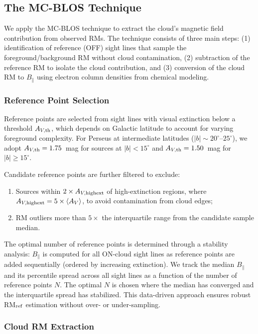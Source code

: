 \documentclass[twocolumn]{aastex701}
\begin{document}
\subsection{The MC-BLOS Technique}

We apply the MC-BLOS technique \citep{tahani2018,tahani2025mcblos} to extract the cloud's magnetic field contribution from observed RMs. The technique consists of three main steps: (1) identification of reference (OFF) sight lines that sample the foreground/background RM without cloud contamination, (2) subtraction of the reference RM to isolate the cloud contribution, and (3) conversion of the cloud RM to $B_\parallel$ using electron column densities from chemical modeling.

\subsubsection{Reference Point Selection}

Reference points are selected from sight lines with visual extinction below a threshold $A_{V,\rm th}$, which depends on Galactic latitude to account for varying foreground complexity. For Perseus at intermediate latitudes ($|b| \sim 20^\circ$--$25^\circ$), we adopt $A_{V,\rm th} = 1.75$~mag for sources at $|b| < 15^\circ$ and $A_{V,\rm th} = 1.50$~mag for $|b| \geq 15^\circ$.

Candidate reference points are further filtered to exclude:
\begin{enumerate}
    \item Sources within $2 \times A_{V,\rm highext}$ of high-extinction regions, where $A_{V,\rm highext} = 5 \times \langle A_V \rangle$, to avoid contamination from cloud edges;
    \item RM outliers more than $5\times$ the interquartile range from the candidate sample median.
\end{enumerate}

The optimal number of reference points is determined through a stability analysis: $B_\parallel$ is computed for all ON-cloud sight lines as reference points are added sequentially (ordered by increasing extinction). We track the median $B_\parallel$ and its percentile spread across all sight lines as a function of the number of reference points $N$. The optimal $N$ is chosen where the median has converged and the interquartile spread has stabilized. This data-driven approach ensures robust RM$_{\rm ref}$ estimation without over- or under-sampling.

\subsubsection{Cloud RM Extraction}
\end{document}
